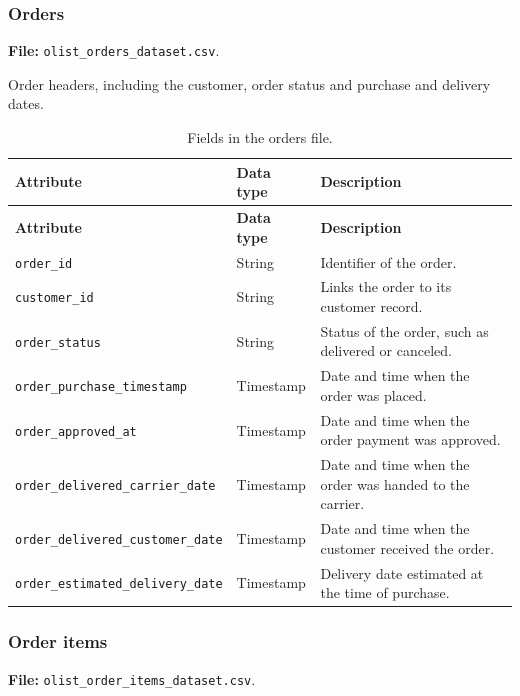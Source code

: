 \documentclass[a4paper,12pt]{article}
\newcommand{\tablestyle}{%
  \small\setstretch{1.05}%
  \renewcommand{\arraystretch}{1.25}%
  \setlength{\extrarowheight}{3pt}%
  \arrayrulecolor{tableborder}%
}
\begin{document}
\subsubsection{Orders}

\textbf{File:} \nolinkurl{olist_orders_dataset.csv}.

Order headers, including the customer, order status and purchase and delivery dates.

{\tablestyle
\begin{longtable}{|L{5.7cm}|L{2.1cm}|L{\dimexpr\textwidth-7.8cm-6\arrayrulewidth\relax}|}
  \caption{Fields in the orders file.}
  \label{tab:dataset-2}\\
  \hline
  \textbf{Attribute} & \textbf{Data type} & \textbf{Description} \\[3pt]\hline
  \endfirsthead
  \hline
  \textbf{Attribute} & \textbf{Data type} & \textbf{Description} \\[3pt]\hline
  \endhead
  \endfoot
  \endlastfoot
  \nolinkurl{order_id} & String & Identifier of the order. \\[3pt]\hline
  \nolinkurl{customer_id} & String & Links the order to its customer record. \\[3pt]\hline
  \nolinkurl{order_status} & String & Status of the order, such as delivered or canceled. \\[3pt]\hline
  \nolinkurl{order_purchase_timestamp} & Timestamp & Date and time when the order was placed. \\[3pt]\hline
  \nolinkurl{order_approved_at} & Timestamp & Date and time when the order payment was approved. \\[3pt]\hline
  \nolinkurl{order_delivered_carrier_date} & Timestamp & Date and time when the order was handed to the carrier. \\[3pt]\hline
  \nolinkurl{order_delivered_customer_date} & Timestamp & Date and time when the customer received the order. \\[3pt]\hline
  \nolinkurl{order_estimated_delivery_date} & Timestamp & Delivery date estimated at the time of purchase. \\[3pt]\hline
\end{longtable}
}

\subsubsection{Order items}

\textbf{File:} \nolinkurl{olist_order_items_dataset.csv}.
\end{document}
